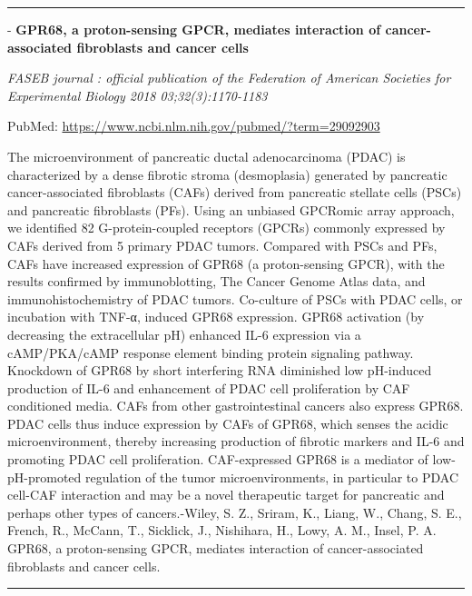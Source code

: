 \documentclass[]{article}
\begin{document}
{}

{}

\begin{center}\rule{0.5\linewidth}{\linethickness}\end{center}

 - \textbf{GPR68, a proton-sensing GPCR, mediates interaction of
cancer-associated fibroblasts and cancer cells}

\emph{FASEB journal : official publication of the Federation of American
Societies for Experimental Biology 2018 03;32(3):1170-1183}

PubMed: \url{https://www.ncbi.nlm.nih.gov/pubmed/?term=29092903}

The microenvironment of pancreatic ductal adenocarcinoma (PDAC) is
characterized by a dense fibrotic stroma (desmoplasia) generated by
pancreatic cancer-associated fibroblasts (CAFs) derived from pancreatic
stellate cells (PSCs) and pancreatic fibroblasts (PFs). Using an
unbiased GPCRomic array approach, we identified 82 G-protein-coupled
receptors (GPCRs) commonly expressed by CAFs derived from 5 primary PDAC
tumors. Compared with PSCs and PFs, CAFs have increased expression of
GPR68 (a proton-sensing GPCR), with the results confirmed by
immunoblotting, The Cancer Genome Atlas data, and immunohistochemistry
of PDAC tumors. Co-culture of PSCs with PDAC cells, or incubation with
TNF-α, induced GPR68 expression. GPR68 activation (by decreasing the
extracellular pH) enhanced IL-6 expression via a cAMP/PKA/cAMP response
element binding protein signaling pathway. Knockdown of GPR68 by short
interfering RNA diminished low pH-induced production of IL-6 and
enhancement of PDAC cell proliferation by CAF conditioned media. CAFs
from other gastrointestinal cancers also express GPR68. PDAC cells thus
induce expression by CAFs of GPR68, which senses the acidic
microenvironment, thereby increasing production of fibrotic markers and
IL-6 and promoting PDAC cell proliferation. CAF-expressed GPR68 is a
mediator of low-pH-promoted regulation of the tumor microenvironments,
in particular to PDAC cell-CAF interaction and may be a novel
therapeutic target for pancreatic and perhaps other types of
cancers.-Wiley, S. Z., Sriram, K., Liang, W., Chang, S. E., French, R.,
McCann, T., Sicklick, J., Nishihara, H., Lowy, A. M., Insel, P. A.
GPR68, a proton-sensing GPCR, mediates interaction of cancer-associated
fibroblasts and cancer cells.

{}

{}

\begin{center}\rule{0.5\linewidth}{\linethickness}\end{center}
\end{document}
